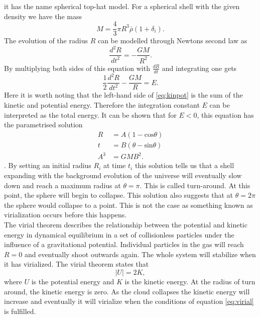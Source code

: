 it has the name spherical top-hat model. For a spherical shell with the given
density we have the mass
\begin{equation}
    M=\frac{4}{3}\pi R^3\bar{\rho}(1+\delta_i).
\end{equation}
The evolution of the radius $R$ can be modelled through Newtons second law as
\begin{equation}
    \frac{d^2R}{dt^2}=-\frac{GM}{R^2}.
\end{equation}
By multiplying both sides of this equation with $\frac{dR}{dt}$ and integrating
one gets
\begin{equation}\label{eq:kinpot}
    \frac{1}{2}\frac{d^2R}{dt^2}-\frac{GM}{R}=E.
\end{equation}
Here it is worth noting that the left-hand side of \ref{eq:kinpot} is the sum of
the kinetic and potential energy. Therefore the integration constant $E$ can be
interpreted as the total energy. It can be shown that for
$E<0$, this equation has the parametrised solution
\begin{align}
    R&=A(1-\mathrm{cos}\theta)\\
    t&=B(\theta-\mathrm{sin}\theta)\\
    A^3&=GMB^2.
\end{align}
\cite[p.~79]{peebles1980}. By setting an initial radius $R_i$ at time $t_i$ this
solution tells us that a shell expanding with the background evolution of the
universe will eventually slow down and reach a maximum radius at
$\theta=\pi$. This is called turn-around. At this point, the sphere will begin to
collapse. This solution also suggests that at $\theta=2\pi$ the sphere would
collapse to a point. This is not the case as something known as virialization
occurs before this happens.\\\indent
The virial theorem describes the relationship between the potential and kinetic
energy in dynamical equilibrium in a set of collisionless particles under the influence of a gravitational
potential. Individual particles in the gas will reach $R=0$ and eventually
shoot outwards again. The whole system will stabilize when it has virialized. The virial theorem states that
\begin{equation}\label{eq:virial}
    \vert U\vert=2K,
\end{equation}
where $U$ is the potential energy and $K$ is the kinetic energy.
At the radius of turn around, the kinetic energy is zero. As the cloud collapses
the kinetic energy will increase and eventually it will virialize when the
conditions of equation \ref{eq:virial} is fulfilled.
